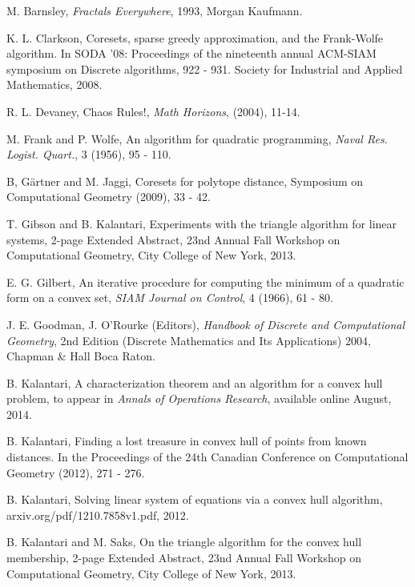 \documentclass{article}
\theoremstyle{definition}
\begin{document}
\begin{thebibliography}{9}



 M. Barnsley, {\it Fractals Everywhere}, 1993,  Morgan Kaufmann.\filbreak

 K. L. Clarkson, Coresets, sparse greedy approximation,
and the Frank-Wolfe algorithm. In SODA
'08: Proceedings of the nineteenth annual ACM-SIAM symposium on Discrete algorithms,
922 - 931. Society for Industrial and Applied Mathematics,
2008. \filbreak

 R. L. Devaney, Chaos Rules!,
{\it Math Horizons},  (2004),  11-14. \filbreak

 M. Frank and P. Wolfe, An algorithm for quadratic
programming, {\it Naval Res. Logist. Quart.},  3 (1956), 95 - 110. \filbreak

 B, G{\"a}rtner and M. Jaggi, Coresets for polytope distance,
Symposium on Computational Geometry (2009), 33 - 42.\filbreak

 T. Gibson and B. Kalantari, Experiments with the triangle algorithm for linear systems, 2-page Extended Abstract, 23nd Annual Fall Workshop on Computational Geometry, City College of New York, 2013. \filbreak

 E. G. Gilbert, An iterative procedure for computing
the minimum of a quadratic form on a convex set, {\it
SIAM Journal on Control}, 4 (1966), 61 - 80. \filbreak

 J. E. Goodman, J. O'Rourke (Editors), {\it Handbook of Discrete and Computational Geometry}, 2nd Edition (Discrete Mathematics and Its Applications) 2004, Chapman \& Hall Boca Raton.\filbreak

 B. Kalantari, A characterization theorem and an algorithm for a convex hull problem, to appear in {\it Annals of Operations Research}, available online August, 2014. \filbreak

 B. Kalantari, Finding a lost treasure in convex hull of points from known distances. In the  Proceedings of the 24th Canadian Conference on Computational Geometry (2012), 271 - 276. \filbreak

 B. Kalantari, Solving linear system of equations via a convex hull algorithm, arxiv.org/pdf/1210.7858v1.pdf,  2012. \filbreak

 B. Kalantari and M. Saks, On the triangle algorithm for the convex hull membership, 2-page Extended Abstract, 23nd Annual Fall Workshop on Computational Geometry, City College of New York, 2013.  \filbreak


\end{thebibliography}
\end{document}
